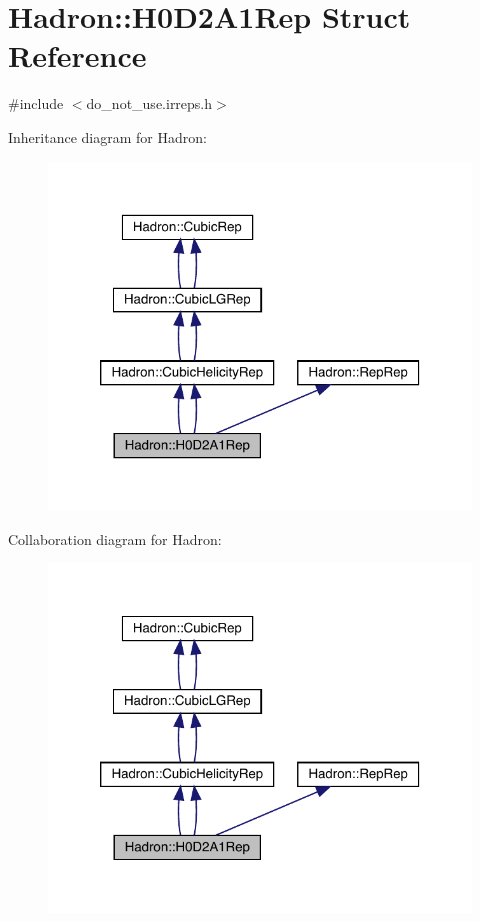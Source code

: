 \hypertarget{structHadron_1_1H0D2A1Rep}{}\section{Hadron\+:\+:H0\+D2\+A1\+Rep Struct Reference}
\label{structHadron_1_1H0D2A1Rep}


{\ttfamily \#include $<$do\+\_\+not\+\_\+use.\+irreps.\+h$>$}



Inheritance diagram for Hadron\+:\nopagebreak
\begin{figure}[H]
\begin{center}
\leavevmode
\includegraphics[width=320pt]{dd/d85/structHadron_1_1H0D2A1Rep__inherit__graph}
\end{center}
\end{figure}


Collaboration diagram for Hadron\+:\nopagebreak
\begin{figure}[H]
\begin{center}
\leavevmode
\includegraphics[width=320pt]{db/dbe/structHadron_1_1H0D2A1Rep__coll__graph}
\end{center}
\end{figure}
